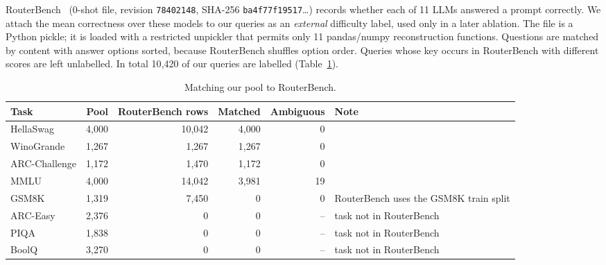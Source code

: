 RouterBench~\citep{hu2024routerbench} (0-shot file, revision \texttt{78402148}, SHA-256 \texttt{ba4f77f19517}\ldots) records whether each of 11 LLMs answered a prompt correctly. We attach the mean correctness over these models to our queries as an \emph{external} difficulty label, used only in a later ablation. The file is a Python pickle; it is loaded with a restricted unpickler that permits only 11 pandas/numpy reconstruction functions. Questions are matched by content with answer options sorted, because RouterBench shuffles option order. Queries whose key occurs in RouterBench with different scores are left unlabelled. In total 10{,}420 of our queries are labelled (Table~\ref{tab:rb}).

\begin{table}[!htbp]\centering\small
\begin{tabular}{lrrrrl}
\toprule
Task & Pool & RouterBench rows & Matched & Ambiguous & Note \\
\midrule
HellaSwag & 4{,}000 & 10{,}042 & 4{,}000 & 0 &  \\
WinoGrande & 1{,}267 & 1{,}267 & 1{,}267 & 0 &  \\
ARC-Challenge & 1{,}172 & 1{,}470 & 1{,}172 & 0 &  \\
MMLU & 4{,}000 & 14{,}042 & 3{,}981 & 19 &  \\
GSM8K & 1{,}319 & 7{,}450 & 0 & 0 & RouterBench uses the GSM8K train split \\
ARC-Easy & 2{,}376 & 0 & 0 & -- & task not in RouterBench \\
PIQA & 1{,}838 & 0 & 0 & -- & task not in RouterBench \\
BoolQ & 3{,}270 & 0 & 0 & -- & task not in RouterBench \\
\bottomrule
\end{tabular}
\caption{Matching our pool to RouterBench.}\label{tab:rb}
\end{table}
